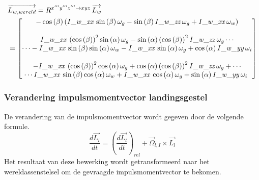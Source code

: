 \begin{align*}
&\overrightarrow{L_{w,wereld}}=R^{x'''y'''z''' \rightarrow xyz}\,\overrightarrow{L_{w}}\\
&=\begin{bmatrix}
-\cos \left( \beta \right)  \left( {\it I\_w\_xx}\,\sin \left( \beta \right) \omega_{g}-\sin \left( \beta\right) {\it I\_w\_zz}\,\omega_{g}+{\it I\_w\_xx}\,\omega_{w}
\right)
\\ 
\\
{\it I\_w\_xx}\, \left( \cos \left( \beta \right)  \right) ^{2}\sin \left( \alpha \right) \omega_{g}-\sin\left( \alpha \right)  \left( \cos \left( \beta \right)  \right) ^{2}
{\it I\_w\_zz}\,\omega_{g} \cdots\\
\cdots -{\it I\_w\_xx}\,\sin \left( \beta \right) \sin \left( \alpha \right) \omega_{w}-{\it I\_w\_xx}\,\sin \left( \alpha \right) \omega_{g}+\cos \left( \alpha \right) {\it I\_w\_yy}\,\omega_{i}
\\ 
\\
-{\it I\_w\_xx}\, \left( \cos \left( \beta \right)  \right) ^{2}\cos \left( \alpha \right) \omega_{g}+\cos\left( \alpha \right)  \left( \cos \left( \beta \right)  \right) ^{2}
{\it I\_w\_zz}\,\omega_{g}+\cdots \\
\cdots{\it I\_w\_xx}\,\sin \left( \beta \right) \cos \left( \alpha \right) \omega_{w}+{\it I\_w\_xx}\,\cos \left( \alpha \right) \omega_{g}+\sin \left( \alpha \right) {\it I\_w\_yy}\,\omega_{i}\
\end{bmatrix}
\end{align*}

\subsubsection{Verandering impulsmomentvector landingsgestel}
De verandering van de impulsmomentvector wordt gegeven door de volgende formule. 
\begin{equation}
\frac{d\overrightarrow{L_{l}}}{dt}=\left(\frac{d\overrightarrow{L_{l}}}{dt}\right)_{rel}+\overrightarrow{\Omega}_{l,I}\times \overrightarrow{L_{l}}
\end{equation}
Het resultaat van deze bewerking wordt getransformeerd naar het wereldassenstelsel om de gevraagde impulsmomentvector te bekomen.

